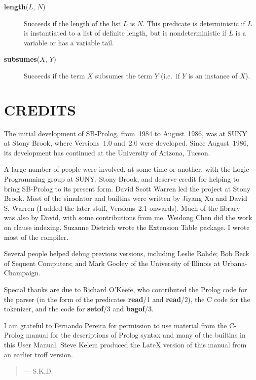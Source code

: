 \begin{description}
\item[{\bf length}($L$, $N$)] 
    Succeeds if the length of the list $L$ is $N$.
    This predicate is deterministic if $L$ is instantiated to a list
    of definite length,
    but is nondeterministic if $L$ is a variable or has a variable tail.

\item[{\bf subsumes}($X$, $Y$)] 
    Succeeds if the term $X$ subsumes the term $Y$
    (i.e.\ if $Y$ is an instance of $X$).
\end{description}

\section{CREDITS}

The initial development of SB-Prolog, from~1984 to August~1986,
was at SUNY at Stony Brook, where Versions~1.0 and~2.0 were developed.
Since August~1986, its development has continued at the University of Arizona,
Tucson.

A large number of people were involved, at some time or another,
with the Logic Programming group at SUNY, Stony Brook,
and deserve credit for helping to bring SB-Prolog to its present form.
David Scott Warren led the project at Stony Brook.
Most of the simulator and builtins were written by Jiyang Xu and David S. Warren
(I added the later stuff, Versions~2.1 onwards).
Much of the library was also by David, with some contributions from me.
Weidong Chen did the work on clause indexing.
Suzanne Dietrich wrote the Extension Table package.
I wrote most of the compiler.

Several people helped debug previous versions, including Leslie Rohde;
Bob Beck of Sequent Computers; and Mark Gooley of the University of
Illinois at Urbana-Champaign.

Special thanks are due to Richard O'Keefe, who contributed the Prolog code for
the parser (in the form of the predicates {\bf read}/1 and {\bf read}/2),
the C code for the tokenizer, and the code for {\bf setof}/3 and {\bf bagof}/3.

I am grateful to Fernando Pereira for permission to use material from the
C-Prolog manual for the descriptions of Prolog syntax and many of the
builtins in this User Manual.  Steve Kelem produced the LateX version of
this manual from an earlier troff version.
\begin{quote}
\raggedleft --- S.K.D.
\end{quote}

